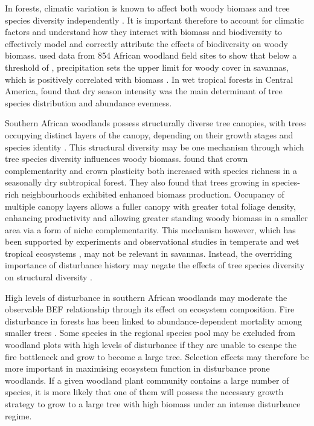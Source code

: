 \documentclass[11pt,a4paper]{article}
\newcommand{\textapprox}{\raisebox{0.5ex}{\texttildelow}}  %
\begin{document}
In forests, climatic variation is known to affect both woody biomass \citep{Michaletz2014, Michaletz2018} and tree species diversity independently \citep{Spasojevic2014}. It is important therefore to account for climatic factors and understand how they interact with biomass and biodiversity to effectively model and correctly attribute the effects of biodiversity on woody biomass. \citet{Sankaran2005} used data from 854 African woodland field sites to show that below a threshold of \textapprox{650 mm MAP}, precipitation sets the upper limit for woody cover in savannas, which is positively correlated with biomass \citep{Chisholm2013, Prado-Junior2016}. In wet tropical forests in Central America, \citet{Condit2013} found that dry season intensity was the main determinant of tree species distribution and abundance evenness.

Southern African woodlands possess structurally diverse tree canopies, with trees occupying distinct layers of the canopy, depending on their growth stages and species identity \citet{Solbrig1996}. This structural diversity may be one mechanism through which tree species diversity influences woody biomass. \citet{Kunz2019} found that crown complementarity and crown plasticity both increased with species richness in a seasonally dry subtropical forest. They also found that trees growing in species-rich neighbourhoods exhibited enhanced biomass production. Occupancy of multiple canopy layers allows a fuller canopy with  greater total foliage density, enhancing productivity and allowing greater standing woody biomass in a smaller area via a form of niche complementarity. This mechanism however, which has been supported by experiments and observational studies in temperate and wet tropical ecosystems \citep{Hardiman2011, Stark2012}, may not be relevant in savannas. Instead, the overriding importance of disturbance history may negate the effects of tree species diversity on structural diversity \citep{Grime2012}.

High levels of disturbance in southern African woodlands may moderate the observable BEF relationship through its effect on ecosystem composition. Fire disturbance in forests has been linked to abundance-dependent mortality among smaller trees \citep{Roques2001, Staver2009, Bond2005}. Some species in the regional species pool may be excluded from woodland plots with high levels of disturbance if they are unable to escape the fire bottleneck and grow to become a large tree. Selection effects may therefore be more important in maximising ecosystem function in disturbance prone woodlands. If a given woodland plant community contains a large number of species, it is more likely that one of them will possess the necessary growth strategy to grow to a large tree with high biomass under an intense disturbance regime. 
\end{document}
